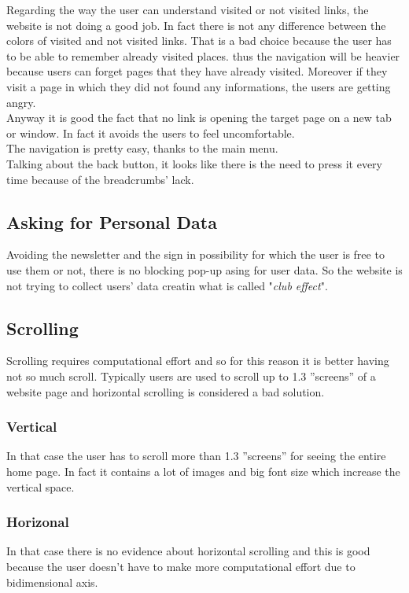 Regarding the way 
the user can understand visited or not visited links, the website is not doing a good job.
In fact there is not any difference
between the colors of visited and not visited links. That is a bad choice because the user has to
be able to remember already visited places. thus the navigation will be heavier because users can forget
pages that they have already visited. Moreover if they visit a page in which they did not found any informations,
the users are getting angry.\\

Anyway it is good the fact that no link is opening the target page on a
new tab or window. In fact it avoids the users to feel
uncomfortable.\\

The navigation is pretty easy, thanks to the main menu.\\

Talking about the
back button, it looks like there is the need to press it every time because of the breadcrumbs' lack.

\subsection{Asking for Personal Data}
Avoiding the newsletter and the sign in possibility for which the user is free to use them or not,
there is no blocking pop-up asing for user data. So the website is not trying to collect users' data creatin
what is called "\textit{club effect}".

\subsection{Scrolling}
Scrolling requires computational effort and so for this reason it is better having not so much scroll.
Typically users are used to scroll up to 1.3 ”screens” of a website page and horizontal scrolling is
considered a bad solution.

\subsubsection{Vertical}
In that case the user has to scroll
more than 1.3 ”screens” for seeing the entire home page.
In fact it contains a lot of images and big font size which increase the vertical space.

\subsubsection{Horizonal}
In that case there is no evidence about horizontal scrolling and this is good because the user
doesn't have to make more computational effort due to bidimensional axis.

